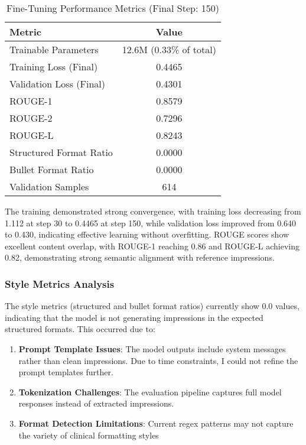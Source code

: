 \documentclass[11pt,letterpaper]{article}
\begin{document}
\begin{table}[h]
\centering
\caption{Fine-Tuning Performance Metrics (Final Step: 150)}
\label{tab:training_results}
\begin{tabular}{@{}lc@{}}
\toprule
\textbf{Metric} & \textbf{Value} \\
\midrule
Trainable Parameters & 12.6M (0.33\% of total) \\
Training Loss (Final) & 0.4465 \\
Validation Loss (Final) & 0.4301 \\
ROUGE-1 & 0.8579 \\
ROUGE-2 & 0.7296 \\
ROUGE-L & 0.8243 \\
Structured Format Ratio & 0.0000 \\
Bullet Format Ratio & 0.0000 \\
Validation Samples & 614 \\
\bottomrule
\end{tabular}
\end{table}

The training demonstrated strong convergence, with training loss decreasing from 1.112 at step 30 to 0.4465 at step 150, while validation loss improved from 0.640 to 0.430, indicating effective learning without overfitting. ROUGE scores show excellent content overlap, with ROUGE-1 reaching 0.86 and ROUGE-L achieving 0.82, demonstrating strong semantic alignment with reference impressions.

\subsubsection{Style Metrics Analysis}
The style metrics (structured and bullet format ratios) currently show 0.0 values, indicating that the model is not generating impressions in the expected structured formats. This occurred due to:

\begin{enumerate}
    \item \textbf{Prompt Template Issues}: The model outputs include system messages rather than clean impressions. Due to time constraints, I could not refine the prompt templates further.
    \item \textbf{Tokenization Challenges}: The evaluation pipeline captures full model responses instead of extracted impressions. 
    \item \textbf{Format Detection Limitations}: Current regex patterns may not capture the variety of clinical formatting styles
\end{enumerate}
\end{document}
